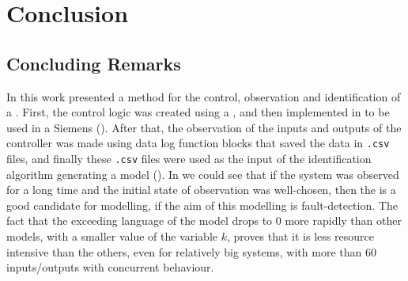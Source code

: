 \chapter{Conclusion}
\label{cha:conclusion}


\section{Concluding Remarks}
\label{sec:concludingRemarks}
In this work presented a method for the control, observation and identification of a
\DES{}. First, the control logic was created using a \CIPN, and then implemented
in \LD{} to be used in a Siemens \PLC{} (). After that, the observation of the
inputs and outputs of the controller was made using data log function blocks that saved the data in
\verb|.csv| files, and finally these \verb|.csv| files were used as the input of the
identification algorithm generating a \DAOCT{} model (). In
 we could see that if the system was observed for a long
time and the initial state of observation was well-chosen, then the \DAOCT{} is
a good candidate for modelling, if the aim of this modelling is fault-detection.
The fact that the exceeding language of the \DAOCT{} model drops to $0$ more
rapidly than other models, with a smaller value of the variable $k$, proves that it is less resource intensive than the
others, even for relatively big
systems, with more than $60$ inputs\slash outputs with concurrent behaviour.



